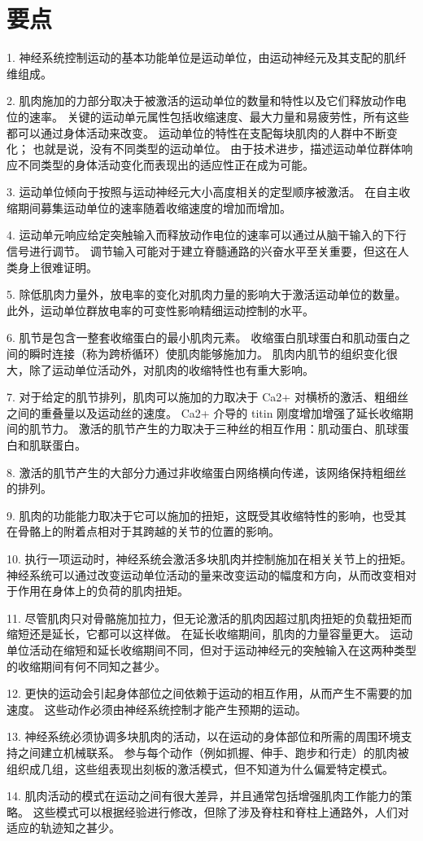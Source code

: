 \section{要点}
1. 神经系统控制运动的基本功能单位是运动单位，由运动神经元及其支配的肌纤维组成。 


2. 肌肉施加的力部分取决于被激活的运动单位的数量和特性以及它们释放动作电位的速率。
关键的运动单元属性包括收缩速度、最大力量和易疲劳性，所有这些都可以通过身体活动来改变。
运动单位的特性在支配每块肌肉的人群中不断变化；
也就是说，没有不同类型的运动单位。
由于技术进步，描述运动单位群体响应不同类型的身体活动变化而表现出的适应性正在成为可能。


3. 运动单位倾向于按照与运动神经元大小高度相关的定型顺序被激活。
在自主收缩期间募集运动单位的速率随着收缩速度的增加而增加。


4. 运动单元响应给定突触输入而释放动作电位的速率可以通过从脑干输入的下行信号进行调节。
调节输入可能对于建立脊髓通路的兴奋水平至关重要，但这在人类身上很难证明。


5. 除低肌肉力量外，放电率的变化对肌肉力量的影响大于激活运动单位的数量。
此外，运动单位群放电率的可变性影响精细运动控制的水平。


6. 肌节是包含一整套收缩蛋白的最小肌肉元素。
收缩蛋白肌球蛋白和肌动蛋白之间的瞬时连接（称为跨桥循环）使肌肉能够施加力。
肌肉内肌节的组织变化很大，除了运动单位活动外，对肌肉的收缩特性也有重大影响。


7. 对于给定的肌节排列，肌肉可以施加的力取决于 Ca2+ 对横桥的激活、粗细丝之间的重叠量以及运动丝的速度。
Ca2+ 介导的 titin 刚度增加增强了延长收缩期间的肌节力。
激活的肌节产生的力取决于三种丝的相互作用：肌动蛋白、肌球蛋白和肌联蛋白。


8. 激活的肌节产生的大部分力通过非收缩蛋白网络横向传递，该网络保持粗细丝的排列。


9. 肌肉的功能能力取决于它可以施加的扭矩，这既受其收缩特性的影响，也受其在骨骼上的附着点相对于其跨越的关节的位置的影响。


10. 执行一项运动时，神经系统会激活多块肌肉并控制施加在相关关节上的扭矩。
神经系统可以通过改变运动单位活动的量来改变运动的幅度和方向，从而改变相对于作用在身体上的负荷的肌肉扭矩。


11. 尽管肌肉只对骨骼施加拉力，但无论激活的肌肉因超过肌肉扭矩的负载扭矩而缩短还是延长，它都可以这样做。
在延长收缩期间，肌肉的力量容量更大。
运动单位活动在缩短和延长收缩期间不同，但对于运动神经元的突触输入在这两种类型的收缩期间有何不同知之甚少。


12. 更快的运动会引起身体部位之间依赖于运动的相互作用，从而产生不需要的加速度。
这些动作必须由神经系统控制才能产生预期的运动。


13. 神经系统必须协调多块肌肉的活动，以在运动的身体部位和所需的周围环境支持之间建立机械联系。
参与每个动作（例如抓握、伸手、跑步和行走）的肌肉被组织成几组，这些组表现出刻板的激活模式，但不知道为什么偏爱特定模式。


14. 肌肉活动的模式在运动之间有很大差异，并且通常包括增强肌肉工作能力的策略。
这些模式可以根据经验进行修改，但除了涉及脊柱和脊柱上通路外，人们对适应的轨迹知之甚少。


